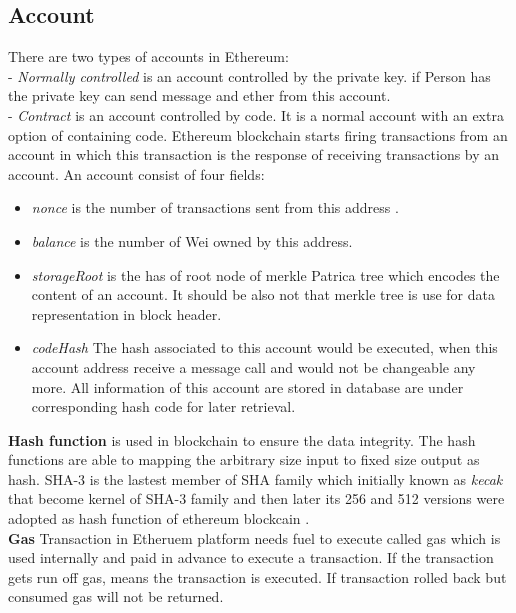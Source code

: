 \subsection{Account}
There are two types of accounts in Ethereum:\\
- \textit{Normally controlled} is an account controlled
by the private key. if Person has the private key can send message and ether from this account.\\
- \textit{Contract} is an account controlled by code. It is a normal account with an extra option of containing code. Ethereum blockchain starts firing transactions from an account in which this transaction is the response of receiving transactions by an account\cite{Egbertsen}. An account consist of four fields:\\
 \begin{itemize}
     \item \textit{nonce} is the number of transactions sent from this address \cite{Gavin}.
     \item \textit{balance} is the number of Wei owned by this address\cite{Gavin}.
     \item \textit{storageRoot} is the has of root node of merkle Patrica tree which encodes the content of an account. It should be also not that merkle tree is use for data representation in block header\cite{Gavin}.
     \item \textit{codeHash}
     The hash associated to this account would be executed, when this account address receive a message call and would not be changeable any more. All information of this account are stored in database are under corresponding hash code for later retrieval. \\
    
\end{itemize}
\textbf{Hash function}  is used in blockchain to ensure the data integrity. The hash functions are able to mapping the arbitrary size input to fixed size output as hash. SHA-3 is the lastest member of SHA family which initially known as \textit{kecak} that become kernel of SHA-3 family and then later its 256 and 512 versions were adopted as hash function of ethereum blockcain \cite{Dilhara}.\\
\textbf{Gas} Transaction in Etheruem platform needs fuel to execute called gas which is used internally and paid in advance to execute a transaction. If the transaction gets run off gas, means the transaction is executed. If transaction rolled back but consumed gas will not be returned.\\
